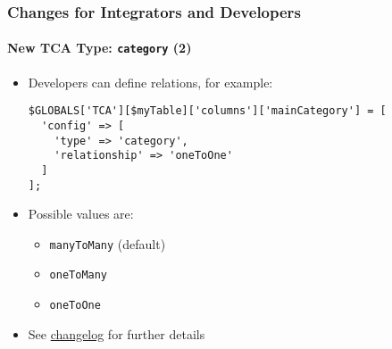 %

\begin{frame}[fragile]
	\frametitle{Changes for Integrators and Developers}
	\framesubtitle{New TCA Type: \texttt{category} (2)}


	\begin{itemize}
		\item Developers can define relations, for example:
\begin{lstlisting}
$GLOBALS['TCA'][$myTable]['columns']['mainCategory'] = [
  'config' => [
    'type' => 'category',
    'relationship' => 'oneToOne'
  ]
];
\end{lstlisting}

		\item Possible values are:
			\begin{itemize}
				\item \texttt{manyToMany} (default)
				\item \texttt{oneToMany}
				\item \texttt{oneToOne}
			\end{itemize}

		\item See \href{https://docs.typo3.org/c/typo3/cms-core/master/en-us/Changelog/11.4/Feature-94622-NewTCATypeCategory.html}{changelog} for further details

	\end{itemize}

\end{frame}

